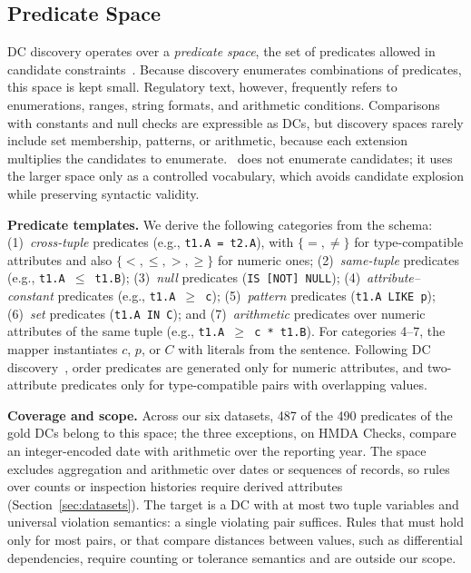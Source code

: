 \subsection{Predicate Space}
\label{sec:mapper:predicate-space}

DC discovery operates over a \emph{predicate space}, the set of predicates allowed in candidate constraints~\cite{chu2013discovering,Pena2019DiscoveryDC}. Because discovery enumerates combinations of predicates, this space is kept small. Regulatory text, however, frequently refers to enumerations, ranges, string formats, and arithmetic conditions. Comparisons with constants and null checks are expressible as DCs, but discovery spaces rarely include set membership, patterns, or arithmetic, because each extension multiplies the candidates to enumerate. \system\ does not enumerate candidates; it uses the larger space only as a controlled vocabulary, which avoids candidate explosion while preserving syntactic validity.

\smallskip\noindent\textbf{Predicate templates.}
We derive the following categories from the schema:
(1)~\emph{cross-tuple} predicates (e.g., \texttt{t1.A = t2.A}), with $\{=,\neq\}$ for type-compatible attributes and also $\{<,\leq,>,\geq\}$ for numeric ones;
(2)~\emph{same-tuple} predicates (e.g., \texttt{t1.A $\leq$ t1.B});
(3)~\emph{null} predicates (\texttt{IS [NOT] NULL});
(4)~\emph{attribute--constant} predicates (e.g., \texttt{t1.A $\geq$ c});
(5)~\emph{pattern} predicates (\texttt{t1.A LIKE p});
(6)~\emph{set} predicates (\texttt{t1.A IN C}); and
(7)~\emph{arithmetic} predicates over numeric attributes of the same tuple (e.g., \texttt{t1.A $\geq$ c * t1.B}).
For categories 4--7, the mapper instantiates $c$, $p$, or $C$ with literals from the sentence. Following DC discovery~\cite{chu2013discovering}, order predicates are generated only for numeric attributes, and two-attribute predicates only for type-compatible pairs with overlapping values.

\smallskip\noindent\textbf{Coverage and scope.}
Across our six datasets, 487 of the 490 predicates of the gold DCs belong to this space; the three exceptions, on HMDA Checks, compare an integer-encoded date with arithmetic over the reporting year. The space excludes aggregation and arithmetic over dates or sequences of records, so rules over counts or inspection histories require derived attributes (Section~\ref{sec:datasets}). The target is a DC with at most two tuple variables and universal violation semantics: a single violating pair suffices. Rules that must hold only for most pairs, or that compare distances between values, such as differential dependencies, require counting or tolerance semantics and are outside our scope.

